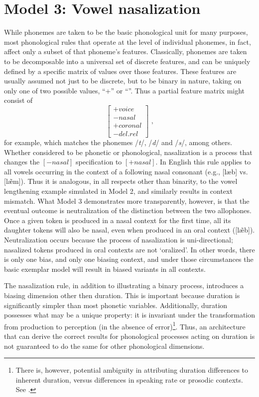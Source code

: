 \section{\label{subsec:Model-3:-Nasalization}Model 3: Vowel nasalization}

While phonemes are taken to be the basic phonological unit for many
purposes, most phonological rules that operate at the level of individual
phonemes, in fact, affect only a subset of that phoneme's features.
Classically, phonemes are taken to be decomposable into a universal
set of discrete features, and can be uniquely defined by a specific
matrix of values over those features. These features are usually assumed
not just to be discrete, but to be binary in nature, taking on only
one of two possible values, “+” or “\textminus”. Thus a partial
feature matrix might consist of 
\[\left[\begin{array}{c}
+\textit{voice}\\
-\textit{nasal}\\
+\textit{coronal}\\
-\textit{del.rel}
\end{array}\right]\text{ ,}\]
for example, which matches the phonemes /\emph{t}/, /\emph{d}/\emph{
}and /\emph{s}/, among others. Whether considered to be phonetic or
phonological, nasalization is a process that changes the $\left[-\textit{nasal}\right]$
specification to $\left[+\textit{nasal}\right]$. In English this rule applies
to all vowels occurring in the context of a following nasal consonant
(e.g., {[læb]} vs. {[læ̃m]}). Thus it is analogous,
in all respects other than binarity, to the vowel lengthening example
simulated in Model 2, and similarly results in context mismatch. What
Model 3 demonstrates more transparently, however, is that the eventual
outcome is neutralization of the distinction between the two allophones.
Once a given token is produced in a nasal context for the first time,
all its daughter tokens will also be nasal, even when produced in
an oral context ({[læ̃b]}). Neutralization occurs because
the process of nasalization is uni-directional; nasalized tokens produced
in oral contexts are not `oralized'. In other words, there is only
one bias, and only one biasing context, and under those circumstances
the basic exemplar model will result in biased variants in all contexts.

The nasalization rule, in addition to illustrating a binary process,
introduces a biasing dimension other then duration. This is important
because duration is significantly simpler than most phonetic variables.
Additionally, duration possesses what may be a unique property: it
is invariant under the transformation from production to perception
(in the absence of error)\footnote{There is, however, potential ambiguity in attributing duration differences
to inherent duration, versus differences in speaking rate or prosodic
contexts. See . }. Thus, an architecture that can derive the correct results for phonological
processes acting on duration is not guaranteed to do the same for
other phonological dimensions. 

